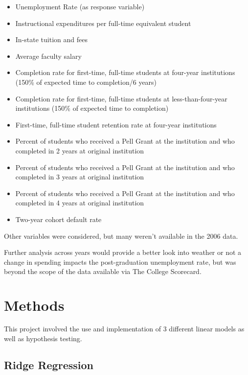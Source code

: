 \documentclass{article}\usepackage[]{graphicx}\usepackage[]{color}
\begin{document}
\begin{itemize}
\item Unemployment Rate (as response variable)
\item Instructional expenditures per full-time equivalent student
\item In-state tuition and fees
\item Average faculty salary
\item Completion rate for first-time, full-time students at four-year institutions (150\% of expected time to completion/6 years)
\item Completion rate for first-time, full-time students at less-than-four-year institutions (150\% of expected time to completion)
\item First-time, full-time student retention rate at four-year institutions
\item Percent of students who received a Pell Grant at the institution and who completed in 2 years at original institution
\item Percent of students who received a Pell Grant at the institution and who completed in 3 years at original institution
\item Percent of students who received a Pell Grant at the institution and who completed in 4 years at original institution
\item Two-year cohort default rate
\end{itemize}

Other variables were considered, but many weren't available in the 2006 data. 

Further analysis across years would provide a better look into weather or not a change in spending impacts the post-graduation unemployment rate, but was beyond the scope of the data available via The College Scorecard. 

\maketitle
\section{Methods}

This project involved the use and implementation of 3 different linear models as well as hypothesis testing.

\subsection{Ridge Regression}
\end{document}
